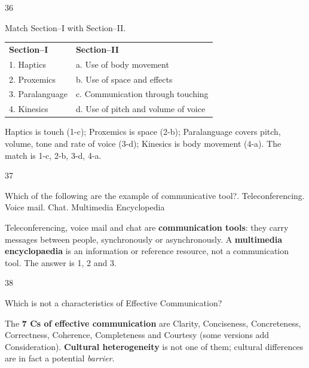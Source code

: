 \begin{question}{36}
{Match Section--I with Section--II.\\[2pt]
\begin{tabular}{@{}ll@{}}
\textbf{Section--I} & \textbf{Section--II}\\
1. Haptics & a. Use of body movement\\
2. Proxemics & b. Use of space and effects\\
3. Paralanguage & c. Communication through touching\\
4. Kinesics & d. Use of pitch and volume of voice\\
\end{tabular}\par}
\begin{explain}
Haptics is touch (1-c); Proxemics is space (2-b); Paralanguage covers pitch, volume, tone and rate of voice (3-d); Kinesics is body movement (4-a). The match is 1-c, 2-b, 3-d, 4-a.
\end{explain}
\end{question}

\begin{question}{37}
{Which of the following are the example of communicative tool?. Teleconferencing. Voice mail. Chat. Multimedia Encyclopedia\par}
\begin{explain}
Teleconferencing, voice mail and chat are \textbf{communication tools}: they carry messages between people, synchronously or asynchronously. A \textbf{multimedia encyclopaedia} is an information or reference resource, not a communication tool. The answer is 1, 2 and 3.
\end{explain}
\end{question}

\begin{question}{38}
{Which is not a characteristics of Effective Communication?\par}
\begin{explain}
The \textbf{7 Cs of effective communication} are Clarity, Conciseness, Concreteness, Correctness, Coherence, Completeness and Courtesy (some versions add Consideration). \textbf{Cultural heterogeneity} is not one of them; cultural differences are in fact a potential \emph{barrier}.
\end{explain}
\end{question}

